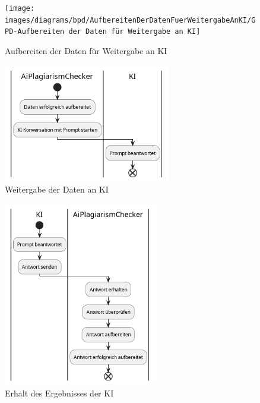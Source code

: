 \begin{figure}[H]
    \centering
    \texttt{[image: images/diagrams/bpd/AufbereitenDerDatenFuerWeitergabeAnKI/GPD-Aufbereiten der Daten für Weitergabe an KI]}
    \caption{Aufbereiten der Daten für Weitergabe an KI}
    \label{fig:aufbereitenDerDatenFuerWeitergabeAnKI}
\end{figure}

\begin{figure}[H]
    \centering
    \includegraphics[width=0.65\textwidth]{images/diagrams/bpd/WeitergabeDerDatenAnKI/GPD-Weitergabe der Daten an KI}
    \caption{Weitergabe der Daten an KI}
    \label{fig:weitergabeDerDatenAnKI}
\end{figure}

\begin{figure}[H]
    \centering
    \includegraphics[width=0.6\textwidth]{images/diagrams/bpd/ErhaltDesErgebnissesDerKI/GPD-Erhalt des Ergebnisses der KI}
    \caption{Erhalt des Ergebnisses der KI}
    \label{fig:erhaltDesErgebnissesDerKI}
\end{figure}

